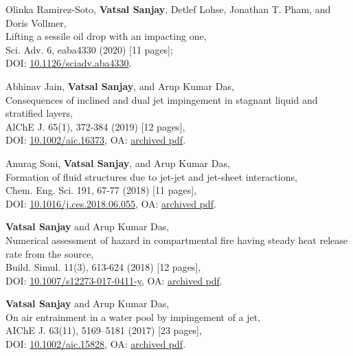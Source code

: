 \documentclass[10pt,a4paper,colorlinks,linkcolor=blue,urlcolor=blue,citecolor=blue]{moderncv}
\begin{document}
\begin{enumerate}[leftmargin=1.5em,label=\textbf{[\arabic*]}]
	\item Olinka Ramirez-Soto, \textbf{Vatsal Sanjay},  Detlef Lohse,  Jonathan T. Pham, and Doris Vollmer,\\
	Lifting a sessile oil drop with an impacting one,\\
	Sci. Adv. 6, eaba4330  (2020) [11 pages];\\
	\faFile\hspace{0.2em}DOI: \href{https://doi.org/10.1126/sciadv.aba4330}{10.1126/sciadv.aba4330}.

	\item Abhinav Jain, \textbf{Vatsal Sanjay}, and Arup Kumar Das,\\
	Consequences of inclined and dual jet impingement in stagnant liquid and stratified layers,\\
	AlChE J. 65(1), 372-384  (2019) [12 pages],\\
	\faLock\hspace{0.2em}DOI: \href{https://doi.org/10.1002/aic.16373}{10.1002/aic.16373}, \faFile\hspace{0.2em}OA: \href{https://tinyurl.com/24p5dy8s}{archived pdf}.

	\item Anurag Soni, \textbf{Vatsal Sanjay}, and Arup Kumar Das,\\
	Formation of fluid structures due to jet-jet and jet-sheet interactions,\\
	Chem. Eng. Sci. 191, 67-77  (2018) [11 pages],\\
	\faLock\hspace{0.2em}DOI: \href{https://doi.org/10.1016/j.ces.2018.06.055}{10.1016/j.ces.2018.06.055}, \faFile\hspace{0.2em}OA: \href{https://tinyurl.com/2bv5fznd}{archived pdf}.

	\item \textbf{Vatsal Sanjay} and Arup Kumar Das,\\
	Numerical assessment of hazard in compartmental fire having steady heat release rate from the source,\\
	Build. Simul. 11(3), 613-624  (2018) [12 pages],\\
	\faLock\hspace{0.2em}DOI: \href{https://doi.org/10.1007/s12273-017-0411-y}{10.1007/s12273-017-0411-y}, \faFile\hspace{0.2em}OA: \href{https://tinyurl.com/2bwhzlzv}{archived pdf}.

	\item \textbf{Vatsal Sanjay} and Arup Kumar Das,\\
	On air entrainment in a water pool by impingement of a jet,\\
	AIChE J. 63(11), 5169--5181  (2017) [23 pages],\\
	\faLock\hspace{0.2em}DOI: \href{https://doi.org/10.1002/aic.15828}{10.1002/aic.15828}, \faFile\hspace{0.2em}OA: \href{https://tinyurl.com/24ne4oql}{archived pdf}.


\end{enumerate}
\end{document}

